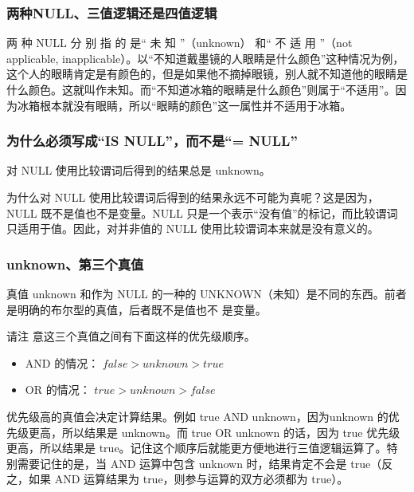 \subsubsection*{两种NULL、三值逻辑还是四值逻辑}
两 种 NULL 分 别 指 的 是“ 未 知 ”（unknown） 和“ 不 适 用 ”（not applicable, inapplicable）。以“不知道戴墨镜的人眼睛是什么颜色”这种情况为例，这个人的眼睛肯定是有颜色的，但是如果他不摘掉眼镜，别人就不知道他的眼睛是什么颜色。这就叫作未知。而“不知道冰箱的眼睛是什么颜色”则属于“不适用”。因为冰箱根本就没有眼睛，所以“眼睛的颜色”这一属性并不适用于冰箱。


\subsubsection*{为什么必须写成“IS NULL”，而不是“= NULL”}
对 NULL 使用比较谓词后得到的结果总是 unknown。

为什么对 NULL 使用比较谓词后得到的结果永远不可能为真呢？这是因为，NULL 既不是值也不是变量。NULL 只是一个表示“没有值”的标记，而比较谓词只适用于值。因此，对并非值的 NULL 使用比较谓词本来就是没有意义的。
\subsubsection*{unknown、第三个真值}
真值 unknown 和作为 NULL 的一种的 UNKNOWN（未知）是不同的东西。前者是明确的布尔型的真值，后者既不是值也不
是变量。

请注
意这三个真值之间有下面这样的优先级顺序。
\begin{itemize}
    \item  AND 的情况： $false > unknown > true$
    \item OR 的情况： $true > unknown > false$
\end{itemize}
优先级高的真值会决定计算结果。例如 true AND unknown，因为unknown 的优先级更高，所以结果是 unknown。而 true OR unknown 的话，因为 true 优先级更高，所以结果是 true。记住这个顺序后就能更方便地进行三值逻辑运算了。特别需要记住的是，当 AND 运算中包含 unknown 时，结果肯定不会是 true（反之，如果 AND 运算结果为 true，则参与运算的双方必须都为 true）。

